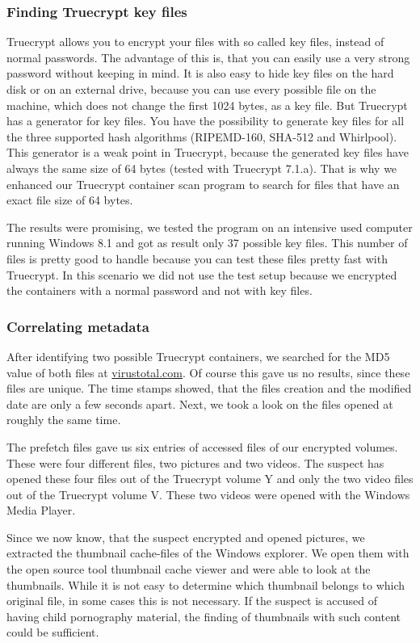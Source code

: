 \subsubsection{Finding Truecrypt key files}
Truecrypt allows you to encrypt your files with so called key files, instead of normal passwords. 
The advantage of this is, that you can easily use a very strong password without keeping in mind. 
It is also easy to hide key files on the hard disk or on an external drive, because you can use every possible file on the machine, which does not change the first 1024 bytes, as a key file. 
But Truecrypt has a generator for key files. 
You have the possibility to generate key files for all the three supported hash algorithms (RIPEMD-160, SHA-512 and Whirlpool). 
This generator is a weak point in Truecrypt, because the generated key files have always the same size of 64 bytes (tested with Truecrypt 7.1.a). 
That is why we enhanced our Truecrypt container scan program to search for files that have an exact file size of 64 bytes.

The results were promising, we tested the program on an intensive used computer running Windows 8.1 and got as result only 37 possible key files. 
This number of files is pretty good to handle because you can test these files pretty fast with Truecrypt. 
In this scenario we did not use the test setup because we encrypted the containers with a normal password and not with key files.
\subsubsection{Correlating metadata}
After identifying two possible Truecrypt containers, we searched for the MD5 value of both files at \url{virustotal.com}. 
Of course this gave us no results, since these files are unique. 
The time stamps showed, that the files creation and the modified date are only a few seconds apart. 
Next, we took a look on the files opened at roughly the same time. 

The prefetch files gave us six entries of accessed files of our encrypted volumes. 
These were four different files, two pictures and two videos.
The suspect has opened these four files out of the Truecrypt volume Y and only the two video files out of the Truecrypt volume V. 
These two videos were opened with the Windows Media Player.

Since we now know, that the suspect encrypted and opened pictures, we extracted the thumbnail cache-files of the Windows explorer. 
We open them with the open source tool thumbnail cache viewer and were able to look at the thumbnails. 
While it is not easy to determine which thumbnail belongs to which original file, in some cases this is not necessary. 
If the suspect is accused of having child pornography material, the finding of thumbnails with such content could be sufficient.

